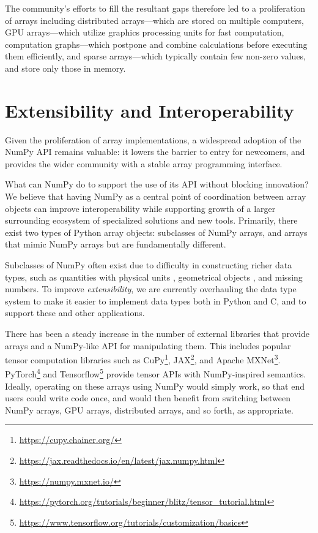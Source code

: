 The community's efforts to fill the resultant gaps therefore led to a
proliferation of arrays including distributed arrays---which are stored on
multiple computers, GPU arrays---which utilize graphics processing units for
fast computation, computation graphs---which postpone and combine calculations
before executing them efficiently, and sparse arrays---which typically contain
few non-zero values, and store only those in memory.

\section*{Extensibility and Interoperability}

Given the proliferation of array implementations, a widespread adoption of the
NumPy API remains valuable: it lowers the barrier to entry for newcomers, and
provides the wider community with a stable array programming interface.

What can NumPy do to support the use of its API without blocking innovation?
We believe that having NumPy as a central point of coordination between array
objects can improve interoperability while supporting growth of a larger
surrounding ecosystem of specialized solutions and new tools.  Primarily, there
exist two types of Python array objects: subclasses of NumPy arrays, and arrays
that mimic NumPy arrays but are fundamentally different.

Subclasses of NumPy often exist due to difficulty in constructing richer data
types, such as quantities with physical units \cite{astropy,Goldbaum2018,pint},
geometrical objects \cite{pygeos}, and missing numbers.
To improve \emph{extensibility}, we are currently overhauling the data type
system to make it easier to implement data types both in Python and C, and to
support these and other applications.

There has been a steady increase in the number of external libraries that
provide arrays and a NumPy-like API for manipulating them.
This includes popular tensor computation libraries such as
CuPy\footnote{\url{https://cupy.chainer.org/}},
JAX\footnote{\url{https://jax.readthedocs.io/en/latest/jax.numpy.html}}, and
Apache MXNet\footnote{\url{https://numpy.mxnet.io/}}.
PyTorch\footnote{\url{https://pytorch.org/tutorials/beginner/blitz/tensor\_tutorial.html}}
and
Tensorflow\footnote{\url{https://www.tensorflow.org/tutorials/customization/basics}}
provide tensor APIs with NumPy-inspired semantics.
Ideally, operating on these arrays using NumPy would simply work, so that end
users could write code once, and would then benefit from switching between
NumPy arrays, GPU arrays, distributed arrays, and so forth, as appropriate.

